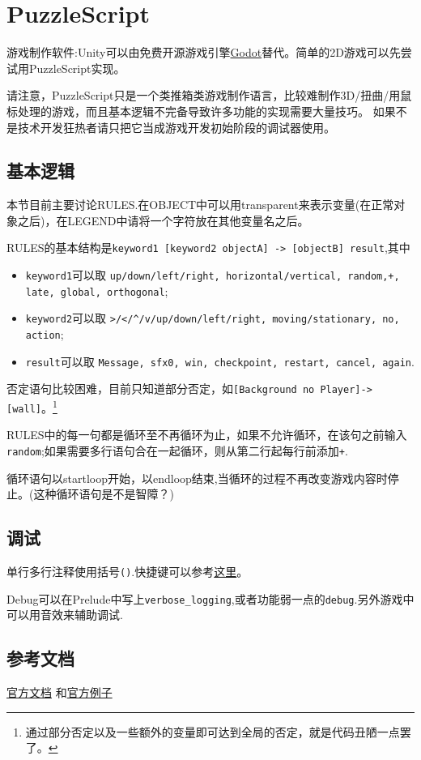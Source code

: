 \documentclass[11pt]{amsart}
\begin{document}
\section{PuzzleScript}
游戏制作软件:Unity可以由免费开源游戏引擎\href{https://docs.godotengine.org/zh_CN/stable/index.html}{Godot}替代。简单的2D游戏可以先尝试用PuzzleScript实现。

请注意，PuzzleScript只是一个类推箱类游戏制作语言，比较难制作3D/扭曲/用鼠标处理的游戏，而且基本逻辑不完备导致许多功能的实现需要大量技巧。 如果不是技术开发狂热者请只把它当成游戏开发初始阶段的调试器使用。
\subsection{基本逻辑}
本节目前主要讨论RULES.在OBJECT中可以用transparent来表示变量(在正常对象之后)，在LEGEND中请将一个字符放在其他变量名之后。

RULES的基本结构是\lstinline|keyword1 [keyword2 objectA] -> [objectB] result|,其中
\begin{itemize}
\item \lstinline|keyword1|可以取 \lstinline|up/down/left/right, horizontal/vertical, random,+, late, global, orthogonal|;
\item \lstinline|keyword2|可以取 \lstinline|>/</^/v/up/down/left/right, moving/stationary, no, action|;
\item \lstinline|result|可以取 \lstinline|Message, sfx0, win, checkpoint, restart, cancel, again|.
\end{itemize}
   

否定语句比较困难，目前只知道部分否定，如\lstinline|[Background no Player]->[wall]|。\footnote{通过部分否定以及一些额外的变量即可达到全局的否定，就是代码丑陋一点罢了。}

RULES中的每一句都是循环至不再循环为止，如果不允许循环，在该句之前输入\lstinline|random|;如果需要多行语句合在一起循环，则从第二行起每行前添加\lstinline|+|.

循环语句以startloop开始，以endloop结束,当循环的过程不再改变游戏内容时停止。(这种循环语句是不是智障？)
\subsection{调试}
单行多行注释使用括号\lstinline|()|.快捷键可以参考\href{https://pancelor.com/PuzzleScript/Documentation/keyboard_shortcuts.html}{这里}。

Debug可以在Prelude中写上\lstinline|verbose_logging|,或者功能弱一点的\lstinline|debug|.另外游戏中可以用音效来辅助调试.
\subsection{参考文档}
\href{https://www.puzzlescript.net/Documentation/documentation.html}{官方文档}
和\href{https://www.puzzlescript.net/Gallery/index.html}{官方例子}
\end{document}
